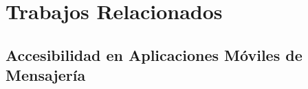 \documentclass[journal]{IEEEtran}
\begin{document}

\section{Trabajos Relacionados}
\label{sec:relacionados}

\subsection{Accesibilidad en Aplicaciones M\'oviles de Mensajer\'ia}
\end{document}
